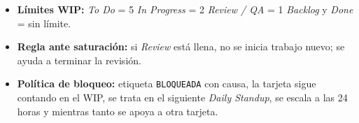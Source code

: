 \documentclass[11pt,a4paper]{article}
\begin{document}
\begin{tcolorbox}[colback=blue!4!white, colframe=blue!70!black, title=\textbf{Entregable del Ejercicio 1: WIP y Política de Bloqueo}, arc=1.5mm]
\begin{itemize}\setlength\itemsep{0.15em}
    \item \textbf{Límites WIP:} \textit{To Do} = 5 \textbar{} \textit{In Progress} = 2 \textbar{} \textit{Review / QA} = 1 \textbar{} \textit{Backlog} y \textit{Done} = sin límite.
    \item \textbf{Regla ante saturación:} si \textit{Review} está llena, no se inicia trabajo nuevo; se ayuda a terminar la revisión.
    \item \textbf{Política de bloqueo:} etiqueta \texttt{BLOQUEADA} con causa, la tarjeta sigue contando en el WIP, se trata en el siguiente \textit{Daily Standup}, se escala a las 24 horas y mientras tanto se apoya a otra tarjeta.
\end{itemize}
\end{tcolorbox}
\end{document}
